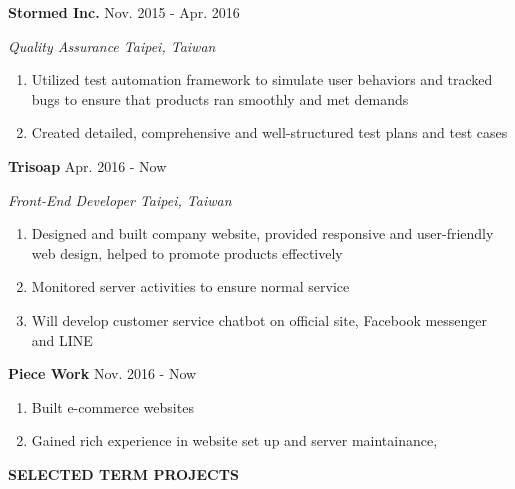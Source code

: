\documentclass[12pt]{article}
\begin{document}
	\textbf{Stormed Inc.} \hfill Nov. 2015 - Apr. 2016

	\textit{Quality Assurance \hfill Taipei, Taiwan}

	\begin{enumerate}

		\item Utilized test automation framework to simulate user behaviors and tracked bugs to ensure that products ran smoothly and met demands

		\item Created detailed, comprehensive and well-structured test plans and test cases

	\end{enumerate}

	\vspace{0.5em}

	\textbf{Trisoap} \hfill Apr. 2016 - Now

	\textit{Front-End Developer \hfill Taipei, Taiwan}

	\begin{enumerate}

		\item Designed and built company website, provided responsive and user-friendly web design, helped to promote products effectively

		\item Monitored server activities to ensure normal service

		\item Will develop customer service chatbot on official site, Facebook messenger and LINE

	\end{enumerate}

	\vspace{0.5em}

	\textbf{Piece Work} \hfill Nov. 2016 - Now

	\begin{enumerate}

		\item Built e-commerce websites

		\item Gained rich experience in website set up and server maintainance,

	\end{enumerate}

	\vspace{1em}

\textbf{\large{\uppercase{Selected Term Projects}}}
\hrulefill{}
\end{document}
